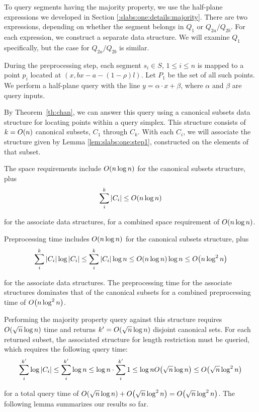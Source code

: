 To query segments having the majority property, we use the half-plane expressions we developed in Section \ref{:slabs:one:details:majority}.  There are two expressions, depending on whether the segment belongs in $Q_1$ or $Q_{2a}/Q_{2b}$. For each expression, we construct a separate data structure. We will examine $Q_1$ specifically, but the case for $Q_{2a}/Q_{2b}$ is similar.

During the preprocessing step, each segment $s_i \in S$, $1 \leq i \leq n$ is mapped to a point $p_i$ located at $(x, bx - a - (1 - \rho)l)$. Let $P_1$ be the set of all such points. We perform a half-plane query with the line $y = \alpha\cdot x + \beta$, where $\alpha$ and $\beta$ are query inputs.

By Theorem~\ref{th:chan}, we can answer this query using a canonical subsets data structure for locating points within a query simplex. This structure consists of $k = O\!\left(n\right)$ canonical subsets, $C_1$ through $C_k$. With each $C_i$, we will associate the structure given by Lemma \ref{lem:slabs:one:step1}, constructed on the elements of that subset.

The space requirements include $O\!\left(n \log{n}\right)$ for the canonical subsets structure, plus
\[
\sum_{i}^{k}{|C_i|} \leq O\!\left(n\log{n}\right)
\]

\noindent for the associate data structures, for a combined space requirement of $O\!\left(n\log{n}\right)$.

Preprocessing time includes $O\!\left(n\log{n}\right)$ for the canonical subsets structure, plus
\[
\sum_{i}^{k}{|C_i| \log{|C_i|}} 
\leq \sum_{i}^{k}{|C_i| \log{n}} 
\leq O\!\left(n\log{n}\right) \log{n} 
\leq O\!\left(n \log^2{n}\right)
\]

\noindent for the associate data structures. The preprocessing time for the associate structures dominates that of the canonical subsets for a combined preprocessing time of $O\!\left(n\log^2{n}\right)$.

Performing the majority property query against this structure requires $O\!\left(\sqrt{n}\log{n}\right)$ time and returns $k' = O\!\left(\sqrt{n}\log{n}\right)$ disjoint canonical sets. For each returned subset, the associated structure for length restriction must be queried, which requires the following query time:
\[
\sum_{i}^{k'}{\log{|C_i|}} 
\leq \sum_{i}^{k'}{\log{n}} 
\leq \log{n} \cdot \sum_{i}^{k'}{1}
\leq \log{n} O\!\left(\sqrt{n}\log{n}\right)
\leq O\!\left(\sqrt{n}\log^2{n}\right)
\]

\noindent
for a total query time of $O\!\left(\sqrt{n}\log{n}\right) + O\!\left(\sqrt{n}\log^2{n}\right) = O\!\left(\sqrt{n}\log^2{n}\right)$. The following lemma summarizes our results so far.

